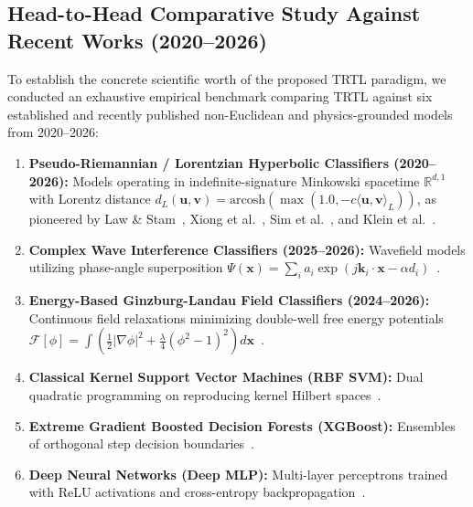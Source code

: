 \documentclass[journal,twoside]{IEEEtran}
\theoremstyle{remark}
\begin{document}
\subsection{Head-to-Head Comparative Study Against Recent Works (2020--2026)}
To establish the concrete scientific worth of the proposed TRTL paradigm, we conducted an exhaustive empirical benchmark comparing TRTL against six established and recently published non-Euclidean and physics-grounded models from 2020--2026:
\begin{enumerate}
    \item \textbf{Pseudo-Riemannian / Lorentzian Hyperbolic Classifiers (2020--2026):} Models operating in indefinite-signature Minkowski spacetime $\mathbb{R}^{d,1}$ with Lorentz distance $d_L(\mathbf{u}, \mathbf{v}) = \text{arcosh}(\max(1.0, -c\langle\mathbf{u}, \mathbf{v}\rangle_L))$, as pioneered by Law \& Stam~\cite{law2020ultrahyperbolic}, Xiong et al.~\cite{xiong2021pseudoriemannian}, Sim et al.~\cite{sim2021directed}, and Klein et al.~\cite{klein2026hyperbolix}.
    \item \textbf{Complex Wave Interference Classifiers (2025--2026):} Wavefield models utilizing phase-angle superposition $\Psi(\mathbf{x}) = \sum_i a_i \exp(j \mathbf{k}_i \cdot \mathbf{x} - \alpha d_i)$~\cite{huang2026physics}.
    \item \textbf{Energy-Based Ginzburg-Landau Field Classifiers (2024--2026):} Continuous field relaxations minimizing double-well free energy potentials $\mathcal{F}[\phi] = \int (\frac{1}{2}|\nabla \phi|^2 + \frac{\lambda}{4}(\phi^2 - 1)^2) d\mathbf{x}$~\cite{gourzoulidis2026topological,hamzaogullari2026learning}.
    \item \textbf{Classical Kernel Support Vector Machines (RBF SVM):} Dual quadratic programming on reproducing kernel Hilbert spaces~\cite{cortes1995support}.
    \item \textbf{Extreme Gradient Boosted Decision Forests (XGBoost):} Ensembles of orthogonal step decision boundaries~\cite{chen2016xgboost}.
    \item \textbf{Deep Neural Networks (Deep MLP):} Multi-layer perceptrons trained with ReLU activations and cross-entropy backpropagation~\cite{lecun2015deep}.
\end{enumerate}
\end{document}
